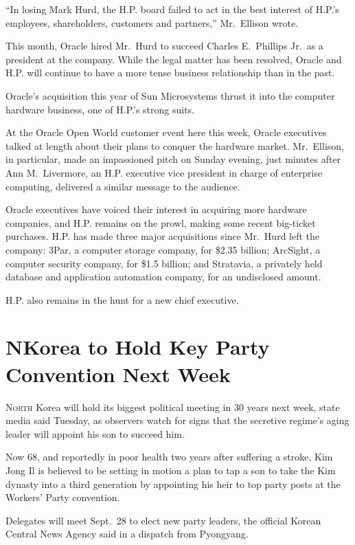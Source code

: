 ﻿\documentclass[12pt]{article}
\begin{document}
``In losing Mark Hurd, the H.P. board failed to act in the best interest of H.P.'s employees,
shareholders, customers and partners,'' Mr.~Ellison wrote.

This month, Oracle hired Mr.~Hurd to succeed Charles E.~Phillips Jr.~as a president at the company.
While the legal matter has been resolved, Oracle and H.P. will continue to have a more tense
business relationship than in the past.

Oracle's acquisition this year of Sun Microsystems thrust it into the computer hardware business,
one of H.P.'s strong suits.

At the Oracle Open World customer event here this week, Oracle executives talked at length about
their plans to conquer the hardware market. Mr.~Ellison, in particular, made an impassioned pitch on
Sunday evening, just minutes after Ann M.~Livermore, an H.P. executive vice president in charge of
enterprise computing, delivered a similar message to the audience.

Oracle executives have voiced their interest in acquiring more hardware companies, and H.P. remains
on the prowl, making some recent big-ticket purchases. H.P. has made three major acquisitions since
Mr.~Hurd left the company: 3Par, a computer storage company, for \$2.35 billion; ArcSight, a
computer security company, for \$1.5 billion; and Stratavia, a privately held database and
application automation company, for an undisclosed amount.

H.P. also remains in the hunt for a new chief executive.

\pagebreak
\section{NKorea to Hold Key Party Convention Next Week}

\lettrine{N}{orth} Korea will hold its biggest political meeting in 30
years next week, state media said Tuesday, as observers watch for signs that the secretive regime's
aging leader will appoint his son to succeed him.

Now 68, and reportedly in poor health two years after suffering a stroke, Kim Jong Il is believed to
be setting in motion a plan to tap a son to take the Kim dynasty into a third generation by
appointing his heir to top party posts at the Workers' Party convention.

Delegates will meet Sept.~28 to elect new party leaders, the official Korean Central News Agency
said in a dispatch from Pyongyang.
\end{document}
